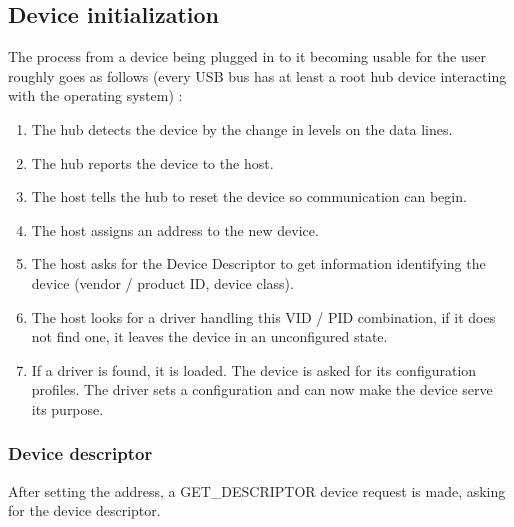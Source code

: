 \documentclass{article}
\begin{document}
\subsection{Device initialization}
\label{devinit}

The process from a device being plugged in to it becoming usable for the user
roughly goes as follows (every USB bus has at least a root hub device interacting with
the operating system) \cite[p. 87ff.]{uc}:

\begin{enumerate}
  \item The hub detects the device by the change in levels on the data lines.
  \item The hub reports the device to the host.
  \item The host tells the hub to reset the device so communication can begin.
  \item The host assigns an address to the new device.
  \item The host asks for the Device Descriptor to get information identifying the device
        (vendor / product ID, device class).
  \item The host looks for a driver handling this VID / PID combination, if it does not find one,
        it leaves the device in an unconfigured state.
  \item If a driver is found, it is loaded. The device is asked for its configuration profiles.
        The driver sets a configuration and can now make the device serve its purpose.
\end{enumerate}

\subsubsection{Device descriptor}

After setting the address, a GET\_DESCRIPTOR
device request is made, asking for the device descriptor.
\end{document}
